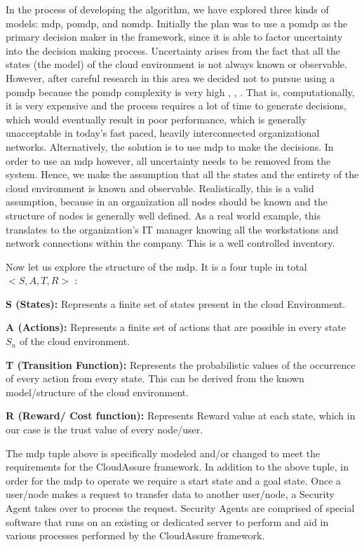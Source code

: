 In the process of
developing the algorithm, we have explored three kinds of models: \gls{mdp},
\gls{pomdp}, and \gls{nomdp}. Initially the plan was to use a \gls{pomdp} as the 
primary decision maker in the
framework, since it is able to factor uncertainty into the decision making process.
Uncertainty arises from the fact that all the states (the model) of the cloud
environment is not always known or observable. However, after careful research
in this area we decided not to pursue using a \gls{pomdp} because the
\gls{pomdp} complexity
is very high \autocite{LeslieP.Kaelbling1998}, \autocite{Zilberman},
\autocite{DongNguyen2009}. 
That is, computationally, it is very expensive and the
process requires a lot of time to generate decisions, which would eventually
result in poor performance, which is generally unacceptable in today's fast paced, heavily interconnected organizational networks.
Alternatively, the solution is to use \gls{mdp} to make the decisions. In order
to use an \gls{mdp} however, all uncertainty needs to be removed from the system.
Hence, we make the assumption that all the states and the entirety of
the cloud environment is known and observable. Realistically, this is a valid
assumption, because in an organization all nodes should be known and the structure of nodes
is generally well defined. As a real world example, this translates to the organization's IT
manager knowing all the workstations and network connections within the
company. This is a well controlled inventory.

Now let us explore the structure of the \gls{mdp}. It
is a four tuple in total $< S, A, T, R >$ \autocite{QimingHe2000}:
\begin{description}
    \item{\textbf{S (States):}} Represents a finite set of states present in the cloud Environment.
    \item{\textbf{A (Actions):}} Represents a finite set of actions that are possible in
        every state $S_n$ of the cloud environment.
    \item{\textbf{T (Transition Function):}} Represents the probabilistic values of the occurrence of every action from every state. This can be derived from the known model/structure of the cloud environment.
    \item{\textbf{R (Reward/ Cost function):}} Represents Reward value at each state, which
    in our case is the trust value of every node/user.  
\end{description}
The \gls{mdp} tuple above is 
specifically modeled and/or changed to meet the requirements for the CloudAssure
framework. In addition to the above tuple, in order for the \gls{mdp} to operate we require a start
state and a goal state. Once a user/node makes a request to transfer data
to another user/node, a Security Agent takes over to process the request. Security Agents are comprised of special software that runs on an existing or dedicated server to perform and aid in various processes performed by the CloudAssure framework.

